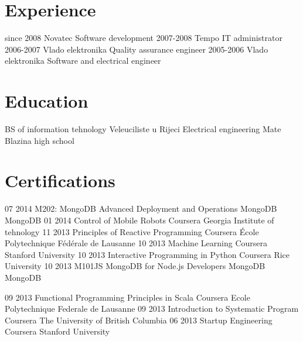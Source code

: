 \documentclass[print]{friggeri-cv}
\begin{document}
\section{Experience}

\begin{entrylist}
  \entry
    {since 2008}
    {Novatec}
    {Software development}
    {\emph{}}
  \entry
    {2007-2008}
    {Tempo}
    {IT administrator}
    {\emph{}}
  \entry
    {2006-2007}
    {Vlado elektronika}
    {Quality assurance engineer}
    {\emph{}}
  \entry
    {2005-2006}
    {Vlado elektronika}
    {Software and electrical engineer}
    {\emph{}}
\end{entrylist}

\section{Education}

\begin{entrylist}
  \entry
    {}
    {BS of information tehnology}
    {Veleuciliste u Rijeci}
    {}
  \entry
    {}
    {Electrical engineering}
    {Mate Blazina high school}
    {}
\end{entrylist}
\section{Certifications}
\begin{entrylist}
  \entry
    {07 2014} 
    {M202: MongoDB Advanced Deployment and Operations}
    {MongoDB}
    {MongoDB}
  \entry
    {01 2014}
    {Control of Mobile Robots}
    {Coursera}
    {Georgia Institute of tehnology}
  \entry
    {11 2013}
    {Principles of Reactive Programming}
    {Coursera}
    {École Polytechnique Fédérale de Lausanne}
  \entry
    {10 2013}
    {Machine Learning} 
    {Coursera}
    {Stanford University}
  \entry
    {10 2013}
    {Interactive Programming in Python}
    {Coursera}
    {Rice University}
  \entry
    {10 2013}
    {M101JS MongoDB for Node.js Developers}
    {MongoDB}
    {MongoDB}
    
  \entry
    {09 2013}
    {Functional Programming Principles in Scala}
    {Coursera}
    {Ecole Polytechnique Federale de Lausanne}
  \entry
    {09 2013}
    {Introduction to Systematic Program}
    {Coursera}
    {The University of British Columbia}
  \entry
    {06 2013}
    {Startup Engineering}
    {Coursera}
    {Stanford University}
\end{entrylist}
\end{document}
